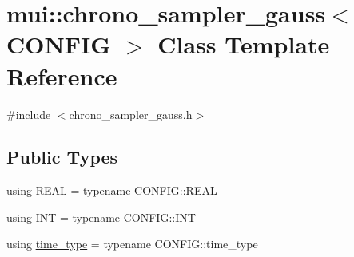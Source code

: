 \hypertarget{classmui_1_1chrono__sampler__gauss}{}\section{mui\+:\+:chrono\+\_\+sampler\+\_\+gauss$<$ C\+O\+N\+F\+IG $>$ Class Template Reference}
\label{classmui_1_1chrono__sampler__gauss}


{\ttfamily \#include $<$chrono\+\_\+sampler\+\_\+gauss.\+h$>$}

\subsection*{Public Types}
\begin{DoxyCompactItemize}
\item 
using \hyperlink{classmui_1_1chrono__sampler__gauss_acb55ad8350ad77bd80ea3979bc01f7a5}{R\+E\+AL} = typename C\+O\+N\+F\+I\+G\+::\+R\+E\+AL
\item 
using \hyperlink{classmui_1_1chrono__sampler__gauss_a86da50872efe4ac7b75234c463e716bf}{I\+NT} = typename C\+O\+N\+F\+I\+G\+::\+I\+NT
\item 
using \hyperlink{classmui_1_1chrono__sampler__gauss_accb8778472734fd419da15b26e087a41}{time\+\_\+type} = typename C\+O\+N\+F\+I\+G\+::time\+\_\+type
\end{DoxyCompactItemize}

